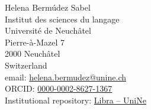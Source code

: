 \documentclass[11pt, a4paper]{article}
\begin{document}
{\LARGE Helena Bermúdez Sabel}\\[1cm]
Institut des sciences du langage\\
Université de Neuchâtel\\Pierre-à-Mazel 7\\2000 Neuchâtel \\ Switzerland\\[.2cm]
email: \href{mailto:helena.bermudez@unine.ch}{helena.bermudez@unine.ch}\\
ORCID: \href{https://orcid.org/0000-0002-8627-1367}{0000-0002-8627-1367}\\
Institutional repository: \href{https://libra.unine.ch/Personnes/Personne/Helena\_Bermudez\_Sabel}{Libra -- UniNe} 



\end{document}
